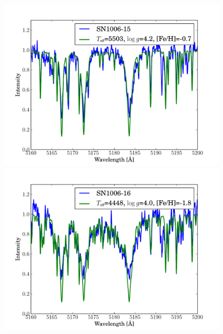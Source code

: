 \begin{figure}[tb]
   \label{fig:sn1006_candfit}
\end{figure}\begin{figure}[tb] %
   \centering
\includegraphics[width=1.1\textwidth, trim=0 0mm 0 10mm, clip]{chapter_sn1006/plots/gold_spectra/sn1006_15.pdf}
\includegraphics[width=1.1\textwidth, trim=0 0mm 0 10mm, clip]{chapter_sn1006/plots/gold_spectra/sn1006_16.pdf}


\end{figure}
